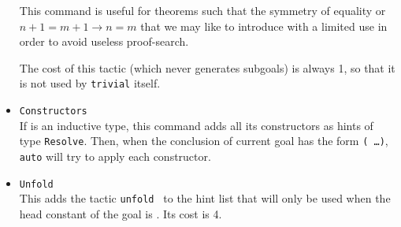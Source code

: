 \begin{itemize}
  This command is useful for theorems such that the symmetry of equality
  or $n+1=m+1 \to n=m$ that we may like to introduce with a
  limited use in order to avoid useless proof-search.
  
  The cost of this tactic (which never generates subgoals) is always 1,
  so that it is not used by {\tt trivial} itself.



\item \texttt{Constructors} {\ident}\\
  
  If {\ident} is an inductive type, this command adds all its
  constructors as hints of type \texttt{Resolve}. Then, when the
  conclusion of current goal has the form \texttt{({\ident} \dots)},
  \texttt{auto} will try to apply each constructor.



\item \texttt{Unfold} {\qualid}\\
  This adds the tactic {\tt unfold {\qualid}} to the hint list
  that will only be used when the head constant of the goal is \ident.
  Its cost is 4.


\end{itemize}
